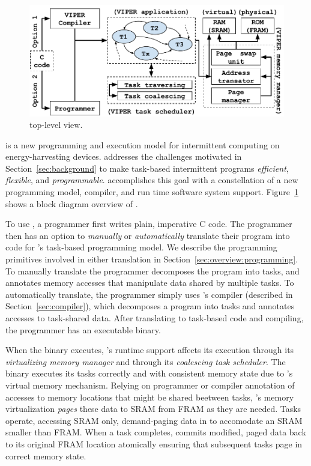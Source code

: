 \begin{figure}
	\centering
	\includegraphics[width=\columnwidth]{figures/viper_block_diagram.pdf}
	\caption{\sys top-level view.}
	\label{fig:system_overview}
\end{figure}

\sys is a new programming and execution model for intermittent computing on
energy-harvesting devices.  \sys addresses the challenges motivated in
Section~\ref{sec:background} to make task-based intermittent programs {\em
efficient}, {\em flexible}, and {\em programmable}.  \sys accomplishes this
goal with a constellation of a new programming model, compiler, and run time
software system support.  Figure~\ref{fig:system_overview} shows a block
diagram overview of \sys.

To use \sys, a programmer first writes plain, imperative C code.  The
programmer then has an option to {\em manually} or {\em automatically}
translate their program into code for \sys's task-based programming  model.  We
describe the programming primitives involved in either translation in
Section~\ref{sec:overview:programming}.
%
To manually translate the programmer decomposes the program into tasks, and
annotates memory accesses that manipulate data shared by multiple tasks.  To
automatically translate, the programmer simply uses \sys's compiler (described
in Section~\ref{sec:compiler}), which decomposes a program into tasks and
annotates accesses to task-shared data. 
%
After translating to task-based code and compiling, the programmer has an
executable \sys binary.  

When the binary executes, \sys's runtime support affects its execution through
its {\em virtualizing memory manager} and through its {\em coalescing task
scheduler}.
%
The \sys binary executes its tasks correctly and with consistent memory state
due to \sys's virtual memory mechanism.  Relying on programmer or compiler
annotation of accesses to memory locations that might be shared beetween tasks,
\sys's memory virtualization {\em pages} these data to SRAM from FRAM as they
are needed.  Tasks operate, accessing SRAM only, demand-paging data in to
accomodate an SRAM smaller than FRAM.  When a task completes, \sys commits
modified, paged data back to its original FRAM location atomically ensuring
that subsequent tasks page in correct memory state. 

